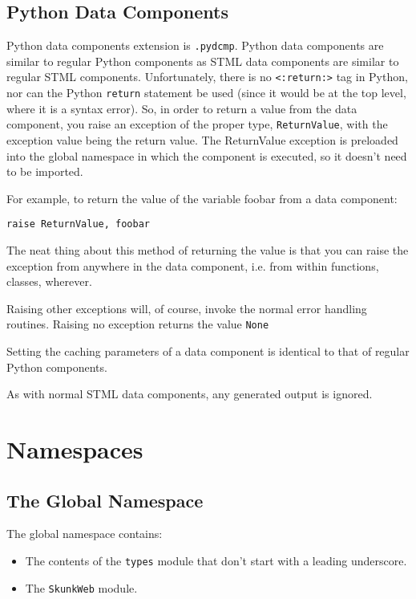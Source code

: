 \documentclass{manual}
\begin{document}
{{\section{Python Data Components}
\label{pythondata}
Python data components extension is \texttt{.pydcmp}.  Python data
components are similar to regular Python components as STML data
components are similar to regular STML components.  Unfortunately,
there is no \texttt{<:return:>} tag in Python, nor can the Python
\texttt{return} statement be used (since it would be at the top
level, where it is a syntax error).  So, in order to return a value
from the data component, you 
raise an exception of the proper type, \texttt{ReturnValue}, with the
exception value being the return value.  The ReturnValue exception is
preloaded into the global namespace in which the component is
executed, so it doesn't need to be imported.

For example, to return the value of the variable foobar from a data
component:
\begin{verbatim}
raise ReturnValue, foobar
\end{verbatim}


The neat thing about this method of returning the value is that you
can raise the exception from anywhere in the data component, i.e. from
within functions, classes, wherever.

Raising other exceptions will, of course, invoke the normal error
handling routines.  Raising no exception returns the value \texttt{None}

Setting the caching parameters of a data component is identical to that of
regular Python components.

As with normal STML data components, any generated output is ignored.



\chapter{Namespaces}
\label{namespaces}


\section{The Global Namespace}
\label{globalns}

The global namespace contains:
\begin{itemize}
\item The contents of the \texttt{types} module that don't start with a
leading underscore. 
\item The \texttt{SkunkWeb} module.
\end{itemize}

}}
\end{document}
